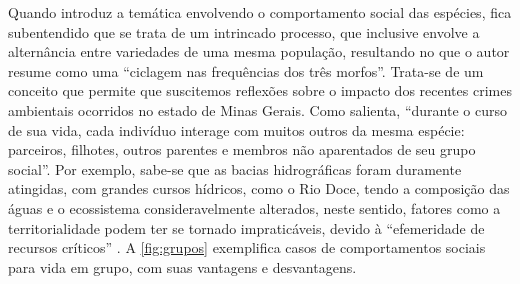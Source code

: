 \documentclass[
article,			%
11pt,				%
oneside,			%
a4paper,			%
english,			%
brazil,				%
sumario=tradicional
]{abntex2}
\begin{document}
	Quando  introduz a temática envolvendo o comportamento social das espécies, fica subentendido que se trata de um intrincado processo, que inclusive envolve a alternância entre variedades de uma mesma população, resultando no que o autor resume como uma ``ciclagem nas frequências dos três morfos''. Trata-se de um conceito que permite que suscitemos reflexões sobre o impacto dos recentes crimes ambientais ocorridos no estado de Minas Gerais. Como  salienta, ``durante o curso de sua vida, cada indivíduo interage com muitos outros da mesma espécie: parceiros, filhotes, outros parentes e membros não aparentados de seu grupo social''. Por exemplo, sabe-se que as bacias hidrográficas foram duramente atingidas, com grandes cursos hídricos, como o Rio Doce, tendo a composição das águas e o ecossistema consideravelmente alterados, neste sentido, fatores como a territorialidade podem ter se tornado impraticáveis, devido à ``efemeridade de recursos críticos'' \cite[p.162]{ricklefs2003a}. A \autoref{fig:grupos} exemplifica casos de comportamentos sociais para vida em grupo, com suas vantagens e desvantagens.
	
\end{document}
